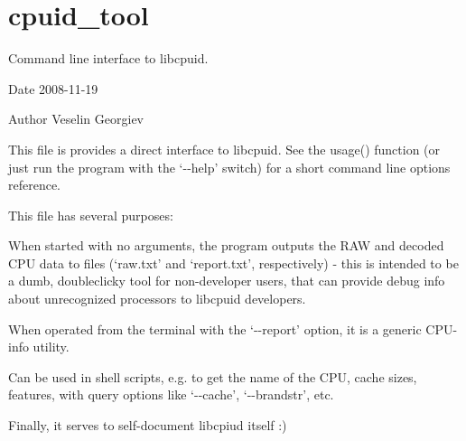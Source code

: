 \chapter{cpuid\+\_\+tool}
\label{cpuid_tool}
Command line interface to libcpuid.

\begin{DoxyDate}{Date}
2008-\/11-\/19 
\end{DoxyDate}
\begin{DoxyAuthor}{Author}
Veselin Georgiev 
\end{DoxyAuthor}
This file is provides a direct interface to libcpuid. See the usage() function (or just run the program with the `-\/-\/help' switch) for a short command line options reference.

This file has several purposes\+:


\begin{DoxyEnumerate}
\item When started with no arguments, the program outputs the RAW and decoded CPU data to files (`raw.\+txt' and `report.\+txt', respectively) -\/ this is intended to be a dumb, doubleclicky tool for non-\/developer users, that can provide debug info about unrecognized processors to libcpuid developers.
\item When operated from the terminal with the `-\/-\/report' option, it is a generic CPU-\/info utility.
\item Can be used in shell scripts, e.\+g. to get the name of the CPU, cache sizes, features, with query options like `-\/-\/cache', `-\/-\/brandstr', etc.
\item Finally, it serves to self-\/document libcpiud itself \+:) 
\end{DoxyEnumerate}
